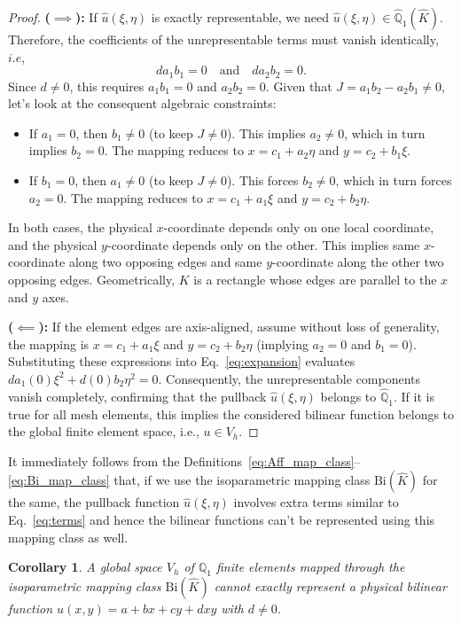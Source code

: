 \documentclass[a4paper]{article}
\theoremstyle{plain}
\newtheorem{corollary}[lemma]{Corollary}
\theoremstyle{definition}
\theoremstyle{remark}
\begin{document}
\begin{proof}
\textbf{($\implies$):} If $\hat{u}(\xi, \eta)$ is exactly representable, we need $\hat{u}(\xi, \eta) \in \hat{\mathbb{Q}}_1(\hat{K})$. Therefore, the coefficients of the unrepresentable terms must vanish identically, $i.e$,
$$
da_1b_1 = 0 \quad \text{and} \quad da_2b_2 = 0.
$$
Since $d \neq 0$, this requires $a_1b_1 = 0$ and $a_2b_2 = 0$. Given that $J = a_1b_2 - a_2b_1 \neq 0$, let's look at the consequent algebraic constraints:
	\begin{itemize}
		\item If $a_1 = 0$, then $b_1 \neq 0$ (to keep $J \neq 0$). This implies $a_2 \neq 0$, which in turn implies $b_2 = 0$. The mapping reduces to $x = c_1 + a_2\eta$ and $y = c_2 + b_1\xi$.
		\item If $b_1 = 0$, then $a_1 \neq 0$ (to keep $J \neq 0$). This forces $b_2 \neq 0$, which in turn forces $a_2 = 0$. The mapping reduces to $x = c_1 + a_1\xi$ and $y = c_2 + b_2\eta$.
	\end{itemize}
	In both cases, the physical $x$-coordinate depends only on one local coordinate, and the physical $y$-coordinate depends only on the other. This implies same $x$-coordinate along two opposing edges and same $y$-coordinate along the other two opposing edges. Geometrically, $K$ is a rectangle whose edges are parallel to the $x$ and $y$ axes.
	
	\textbf{($\impliedby$):} If the element edges are axis-aligned, assume without loss of generality, the mapping is $x = c_1 + a_1\xi$ and $y = c_2 + b_2\eta$ (implying $a_2 = 0$ and $b_1 = 0$). Substituting these expressions into Eq.~\eqref{eq:expansion} evaluates $d a_1(0)\xi^2 + d(0)b_2\eta^2 = 0$. Consequently, the unrepresentable components vanish completely, confirming that the pullback $\hat{u}(\xi, \eta)$ belongs to $ \hat{\mathbb{Q}}_1 $. If it is true for all mesh elements, this implies the considered bilinear function belongs to the global finite element space, i.e., $u \in V_h$.	
\end{proof}

It immediately follows from the Definitions~\ref{eq:Aff_map_class}--\ref{eq:Bi_map_class} that, if we use the isoparametric mapping class $\text{Bi}(\hat{K})$ for the same, the pullback function $\hat{u}(\xi, \eta)$ involves extra terms similar to Eq.~\eqref{eq:terms} and hence the bilinear functions can't be represented using this mapping class as well. 

\begin{corollary}\label{Cor:Isoparametric}
 A global space $V_h$ of $\mathbb{Q}_1$ finite elements mapped through the isoparametric mapping class $\text{Bi}(\hat{K})$ cannot exactly represent a physical bilinear function $u(x,y) = a+ bx+ cy+ dxy$ with $d\neq 0$.
\end{corollary}
\end{document}
